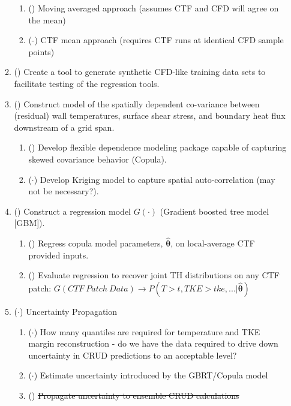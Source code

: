 \begin{enumerate}
\begin{enumerate}
        \begin{enumerate}
            \item (\checkmark) Moving averaged approach (assumes CTF and CFD will agree on the mean)
            \item (\checkmark-) CTF mean approach (requires CTF runs at identical CFD sample points)
        \end{enumerate}
        \item (\checkmark) Create a tool to generate synthetic CFD-like training data sets to facilitate
            testing of the regression tools.
        \item (\checkmark) Construct model of the spatially dependent co-variance between
              (residual) wall temperatures, surface shear stress, and
              boundary heat flux downstream of a grid span.
        \begin{enumerate}
            \item (\checkmark) Develop flexible dependence modeling package capable of capturing skewed covariance behavior (Copula).
            \item ($\cdot$) Develop Kriging model to capture spatial auto-correlation (may not be necessary?).
        \end{enumerate}
        \item (\checkmark) Construct a regression model $G(\cdot)$ (Gradient boosted tree model [GBM]).
        \begin{enumerate}
            \item (\checkmark) Regress copula model parameters, $\bm{\hat\theta}$, on local-average CTF provided inputs.
            \item (\checkmark) Evaluate regression to recover joint TH distributions on any CTF patch:
                $G(CTF\ Patch\ Data) \rightarrow {P(T>t,TKE>tke,...|\bm{\hat\theta})}$
        \end{enumerate}
        \item ($\cdot$) Uncertainty Propagation
        \begin{enumerate}
        	\item ($\cdot$) How many quantiles are required for temperature and TKE margin reconstruction
                                - do we have the data required to drive down uncertainty in CRUD predictions to an acceptable level?
            \item ($\cdot$) Estimate uncertainty introduced by the GBRT/Copula model
            \item (\xmark) \sout{Propagate uncertainty to ensemble CRUD calculations}

\end{enumerate}
\end{enumerate}
\end{enumerate}
